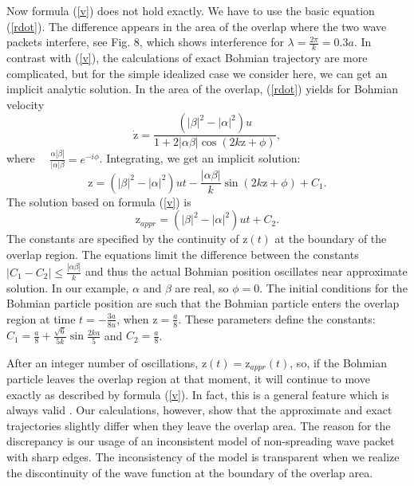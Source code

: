 \documentclass[12pt,preprint,tightenlines]{elsarticle}
\begin{document}
 Now formula (\ref{v})  does not hold exactly. We have to use the
basic equation (\ref{rdot}). The difference appears in the area of
the overlap where the two wave packets interfere, see Fig. 8, which shows interference for $\lambda=\frac{2\pi}{k}=0.3a$. In contrast with
(\ref{v}), the calculations of exact Bohmian trajectory are more
complicated, but for the simple idealized case we consider here, we
can get an implicit analytic solution. In the area of the overlap,
(\ref{rdot}) yields for Bohmian velocity
\begin{equation}
\dot{\mathrm{z}}=\frac{(|\beta|^{2}-|\alpha|^{2})u}{1+2|\alpha\beta|\cos(2k\mathrm{z}+\phi)},\label{zdotns}
\end{equation}
 where $\quad\frac{\alpha|\beta|}{|\alpha|\beta}=e^{-i\phi}$. Integrating,
we get an implicit solution:
\begin{equation}
\mathrm{z}=(|\beta|^{2}-|\alpha|^{2})ut-\frac{|\alpha\beta|}{k}\sin(2k\mathrm{z}+\phi)+C_{1}.\label{zns}
\end{equation}
 The solution based on formula (\ref{v}) is
  \begin{equation}
\mathrm{z}_{appr}=(|\beta|^{2}-|\alpha|^{2})ut+C_{2}.\label{zns1}
\end{equation}
 The constants are specified by the continuity of $\mathrm{z}(t)$
at the boundary of the overlap region. The equations limit the difference
between the constants $|C_{1}-C_{2}|\leq\frac{|\alpha\beta|}{k}$
and thus the actual Bohmian position oscillates near approximate solution.
In our example, $\alpha$ and $\beta$ are real, so $\phi=0$. The
initial conditions for the Bohmian particle position are such that
the Bohmian particle enters the overlap region at time $t=-\frac{3a}{8u}$,
when $\mathrm{z}=\frac{a}{8}$. These parameters define the constants:
$C_{1}=\frac{a}{8} +\frac{\sqrt 6}{5k}\sin\frac{2ka}{5}$ and $C_{2}=\frac{a}{8}$.


After an integer number of oscillations, $\mathrm{z}(t)=\mathrm{z}_{appr}(t)$, so, if the Bohmian particle leaves the overlap
region at that moment,  it will continue
to move exactly as described by formula (\ref{v}).  In fact, this is a general feature which is
always valid \cite{Gold}. Our calculations, however, show that the approximate and exact trajectories  slightly differ when they leave the overlap area.
 The reason for the discrepancy is our usage of   an inconsistent model of non-spreading wave packet with sharp edges.
The  inconsistency of the model   is transparent when we
realize  the discontinuity of the wave function  at the boundary of the overlap area.
\end{document}
